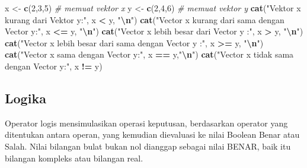 \documentclass[
]{book}
\newenvironment{Shaded}{\begin{snugshade}}{\end{snugshade}}
\newcommand{\CommentTok}[1]{\textcolor[rgb]{0.56,0.35,0.01}{\textit{#1}}}
\newcommand{\DecValTok}[1]{\textcolor[rgb]{0.00,0.00,0.81}{#1}}
\newcommand{\FunctionTok}[1]{\textcolor[rgb]{0.13,0.29,0.53}{\textbf{#1}}}
\newcommand{\NormalTok}[1]{#1}
\newcommand{\OtherTok}[1]{\textcolor[rgb]{0.56,0.35,0.01}{#1}}
\newcommand{\SpecialCharTok}[1]{\textcolor[rgb]{0.81,0.36,0.00}{\textbf{#1}}}
\newcommand{\StringTok}[1]{\textcolor[rgb]{0.31,0.60,0.02}{#1}}
\begin{document}
\begin{Shaded}
\begin{Highlighting}[]
\NormalTok{x }\OtherTok{\textless{}{-}} \FunctionTok{c}\NormalTok{(}\DecValTok{2}\NormalTok{,}\DecValTok{3}\NormalTok{,}\DecValTok{5}\NormalTok{)    }\CommentTok{\# memuat vektor x}
\NormalTok{y }\OtherTok{\textless{}{-}} \FunctionTok{c}\NormalTok{(}\DecValTok{2}\NormalTok{,}\DecValTok{4}\NormalTok{,}\DecValTok{6}\NormalTok{)    }\CommentTok{\# memuat vektor y}
\FunctionTok{cat}\NormalTok{(}\StringTok{"Vektor x  kurang dari Vektor y:"}\NormalTok{, x }\SpecialCharTok{\textless{}}\NormalTok{ y, }\StringTok{"}\SpecialCharTok{\textbackslash{}n}\StringTok{"}\NormalTok{)}
\FunctionTok{cat}\NormalTok{(}\StringTok{"Vector x kurang dari sama dengan Vector y:"}\NormalTok{, x }\SpecialCharTok{\textless{}=}\NormalTok{ y, }\StringTok{"}\SpecialCharTok{\textbackslash{}n}\StringTok{"}\NormalTok{)}
\FunctionTok{cat}\NormalTok{(}\StringTok{"Vector x lebih besar dari Vector y :"}\NormalTok{, x }\SpecialCharTok{\textgreater{}}\NormalTok{ y, }\StringTok{"}\SpecialCharTok{\textbackslash{}n}\StringTok{"}\NormalTok{)}
\FunctionTok{cat}\NormalTok{(}\StringTok{"Vector x lebih besar dari sama dengan Vector y :"}\NormalTok{, x }\SpecialCharTok{\textgreater{}=}\NormalTok{ y, }\StringTok{"}\SpecialCharTok{\textbackslash{}n}\StringTok{"}\NormalTok{)}
\FunctionTok{cat}\NormalTok{(}\StringTok{"Vector x sama dengan Vector y:"}\NormalTok{, x }\SpecialCharTok{==}\NormalTok{ y,}\StringTok{"}\SpecialCharTok{\textbackslash{}n}\StringTok{"}\NormalTok{) }
\FunctionTok{cat}\NormalTok{(}\StringTok{"Vector x tidak sama dengan Vector y:"}\NormalTok{, x }\SpecialCharTok{!=}\NormalTok{ y) }
\end{Highlighting}
\end{Shaded}

\hypertarget{logika}{%
\subsection{Logika}\label{logika}}

Operator logis mensimulasikan operasi keputusan, berdasarkan operator yang ditentukan antara operan, yang kemudian dievaluasi ke nilai Boolean Benar atau Salah. Nilai bilangan bulat bukan nol dianggap sebagai nilai BENAR, baik itu bilangan kompleks atau bilangan real.
\end{document}
